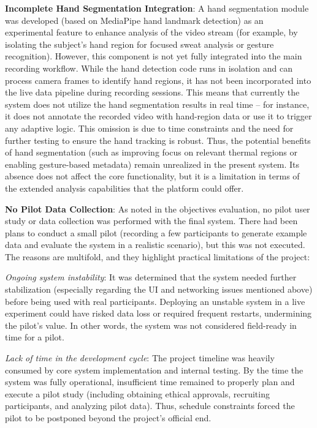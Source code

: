\textbf{Incomplete Hand Segmentation Integration}: A hand segmentation module was developed (based on MediaPipe hand landmark detection) as an experimental feature to enhance analysis of the video stream (for example, by isolating the subject's hand region for focused sweat analysis or gesture recognition). However, this component is not yet fully integrated into the main recording workflow. While the hand detection code runs in isolation and can process camera frames to identify hand regions, it has not been incorporated into the live data pipeline during recording sessions. This means that currently the system does not utilize the hand segmentation results in real time -- for instance, it does not annotate the recorded video with hand-region data or use it to trigger any adaptive logic. This omission is due to time constraints and the need for further testing to ensure the hand tracking is robust. Thus, the potential benefits of hand segmentation (such as improving focus on relevant thermal regions or enabling gesture-based metadata) remain unrealized in the present system. Its absence does not affect the core functionality, but it is a limitation in terms of the extended analysis capabilities that the platform could offer.

\textbf{No Pilot Data Collection}: As noted in the objectives evaluation, no pilot user study or data collection was performed with the final system. There had been plans to conduct a small pilot (recording a few participants to generate example data and evaluate the system in a realistic scenario), but this was not executed. The reasons are multifold, and they highlight practical limitations of the project:

\textit{Ongoing system instability}: It was determined that the system needed further stabilization (especially regarding the UI and networking issues mentioned above) before being used with real participants. Deploying an unstable system in a live experiment could have risked data loss or required frequent restarts, undermining the pilot's value. In other words, the system was not considered field-ready in time for a pilot.

\textit{Lack of time in the development cycle}: The project timeline was heavily consumed by core system implementation and internal testing. By the time the system was fully operational, insufficient time remained to properly plan and execute a pilot study (including obtaining ethical approvals, recruiting participants, and analyzing pilot data). Thus, schedule constraints forced the pilot to be postponed beyond the project's official end.

